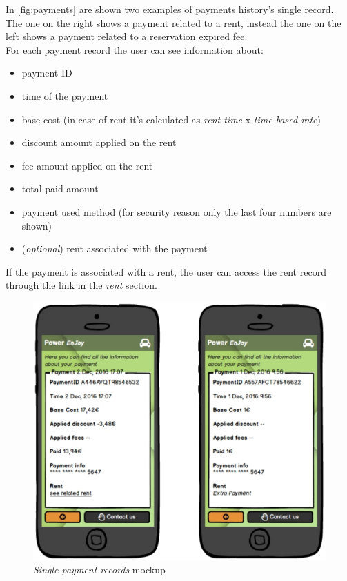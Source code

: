 In \autoref{fig:payments} are shown two examples of payments history's single record. The one on the right shows a payment related to a rent, instead the one on the left shows a payment related to a reservation expired fee. \\

For each payment record the user can see information about:
\begin{itemize}
	\item payment ID
	\item time of the payment
	\item base cost (in case of rent it's calculated as \emph{rent time} x \emph{time based rate})
	\item discount amount applied on the rent 
	\item fee amount applied on the rent
	\item total paid amount
	\item payment used method (for security reason only the last four numbers are shown)
	\item (\emph{optional}) rent associated with the payment
\end{itemize}

If the payment is associated with a rent, the user can access the rent record through the link in the \emph{rent} section.
\\
 
\begin{figure}[h]
			\centering
			\includegraphics[width=0.9\linewidth]{mockups/payments}
			\caption{
				\label{fig:payments} 
				\emph{Single payment records} mockup
			}
		\end{figure}

